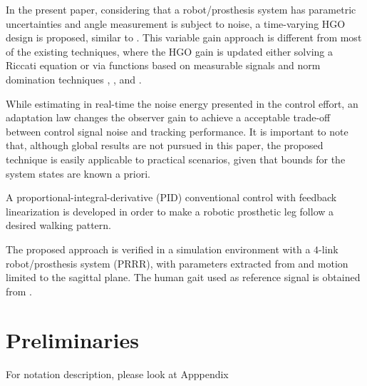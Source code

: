\documentclass[letterpaper, 10 pt, conference]{ieeeconf}  %
\theoremstyle{plain}
\theoremstyle{definition}
\theoremstyle{remark}
\begin{document}
In the present paper, considering that a robot/prosthesis system has parametric uncertainties and angle measurement is subject to noise, a time-varying HGO design is proposed, similar to \cite{POH:2011}. This variable gain approach is different from most of the existing techniques,
where the HGO gain is updated either solving a Riccati equation \cite{P:01}\cite{P:07}\cite{GAL:06} or via functions based on measurable signals and norm domination techniques \cite{LL:05}, \cite{P:07}, \cite{APA:09} and \cite{POH:2011}.

While estimating in real-time the noise energy presented in the control effort, an adaptation law changes the observer gain to achieve a acceptable trade-off between control signal noise and tracking performance. It is important to note that, although global results are not pursued in this paper, the proposed technique is easily applicable to practical scenarios, given that bounds for the system states are known a priori.

A proportional-integral-derivative (PID) conventional control with feedback linearization is developed in order to make a robotic prosthetic leg follow a desired walking pattern. 

The proposed approach is verified in a simulation environment with a $4$-link robot/prosthesis system (PRRR), with parameters extracted from \cite{Richter2015} and motion limited to the sagittal plane. The human gait used as reference signal is obtained from \cite{Schwartz2008}.


\section{Preliminaries}

For notation description, please look at Apppendix

\end{document}
